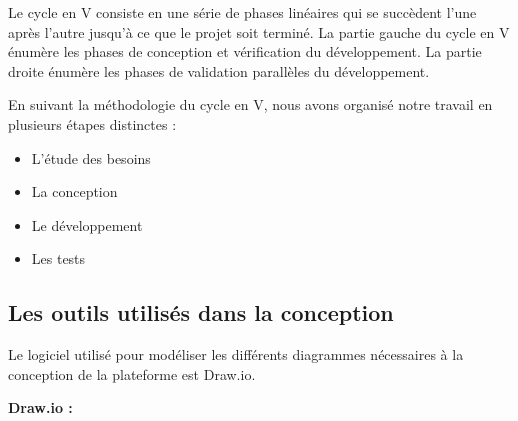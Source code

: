 \documentclass{article}
\begin{document}
\noindent Le cycle en V consiste en une série de phases linéaires qui se succèdent l'une après l'autre jusqu'à ce que le projet soit terminé. La partie gauche du cycle en V énumère les phases de conception et vérification du développement. La partie droite énumère les phases de validation parallèles du développement.\cite{cycleV}

\noindent En suivant la méthodologie du cycle en V, nous avons organisé notre travail en plusieurs étapes distinctes :
\begin{itemize}
    \item L’étude des besoins 
    \item La conception
    \item Le développement
    \item Les tests
\end{itemize}

\subsection{Les outils utilisés dans la conception}
Le logiciel utilisé pour modéliser les différents diagrammes nécessaires à la conception de la plateforme est Draw.io.




\vspace{0,5cm}

\noindent \textbf{Draw.io \cite{drawiointerface}: }
\end{document}
